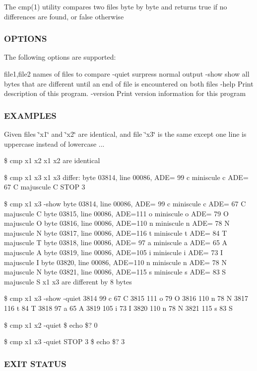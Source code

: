 The cmp(1) utility compares two files byte by byte and returns true if no differences are found, or false otherwise \subsubsection*{O\+P\+T\+I\+O\+NS}

The following options are supported\+:

file1,file2 names of files to compare -\/quiet surpress normal output -\/show show all bytes that are different until an end of file is encountered on both files -\/help Print description of this program. -\/version Print version information for this program

\subsubsection*{E\+X\+A\+M\+P\+L\+ES}

Given files \char`\"{}x1\char`\"{} and \char`\"{}x2\char`\"{} are identical, and file \char`\"{}x3\char`\"{} is the same except one line is uppercase instead of lowercase ...

\$ cmp x1 x2 x1 x2 are identical

\$ cmp x1 x3 x1 x3 differ\+: byte 03814, line 00086, A\+DE= 99 c miniscule c A\+DE= 67 C majuscule C S\+T\+OP 3

\$ cmp x1 x3 -\/show byte 03814, line 00086, A\+DE= 99 c miniscule c A\+DE= 67 C majuscule C byte 03815, line 00086, A\+DE=111 o miniscule o A\+DE= 79 O majuscule O byte 03816, line 00086, A\+DE=110 n miniscule n A\+DE= 78 N majuscule N byte 03817, line 00086, A\+DE=116 t miniscule t A\+DE= 84 T majuscule T byte 03818, line 00086, A\+DE= 97 a miniscule a A\+DE= 65 A majuscule A byte 03819, line 00086, A\+DE=105 i miniscule i A\+DE= 73 I majuscule I byte 03820, line 00086, A\+DE=110 n miniscule n A\+DE= 78 N majuscule N byte 03821, line 00086, A\+DE=115 s miniscule s A\+DE= 83 S majuscule S x1 x3 are different by 8 bytes

\$ cmp x1 x3 -\/show -\/quiet 3814 99 c 67 C 3815 111 o 79 O 3816 110 n 78 N 3817 116 t 84 T 3818 97 a 65 A 3819 105 i 73 I 3820 110 n 78 N 3821 115 s 83 S

\$ cmp x1 x2 -\/quiet \$ echo \$? 0

\$ cmp x1 x3 -\/quiet S\+T\+OP 3 \$ echo \$? 3

\subsubsection*{E\+X\+IT S\+T\+A\+T\+US}

